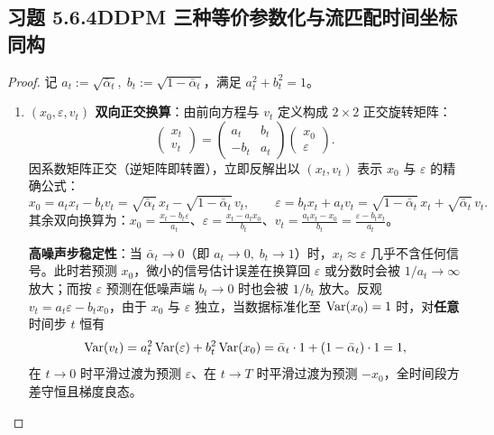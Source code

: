 \subsection*{习题 5.6.4\quad DDPM 三种等价参数化与流匹配时间坐标同构}
\begin{proof}
记 $a_t := \sqrt{\bar{\alpha}_t},\; b_t := \sqrt{1 - \bar{\alpha}_t}$，满足 $a_t^2 + b_t^2 = 1$。
\begin{enumerate}[label=(\alph*), leftmargin=1.8em]
  \item \textbf{$(x_0, \varepsilon, v_t)$ 双向正交换算}：由前向方程与 $v_t$ 定义构成 $2\times 2$ 正交旋转矩阵：
  \[
    \begin{pmatrix} x_t \\ v_t \end{pmatrix}
    = \begin{pmatrix} a_t & b_t \\ -b_t & a_t \end{pmatrix}
      \begin{pmatrix} x_0 \\ \varepsilon \end{pmatrix}.
  \]
  因系数矩阵正交（逆矩阵即转置），立即反解出以 $(x_t, v_t)$ 表示 $x_0$ 与 $\varepsilon$ 的精确公式：
  \[
    x_0 = a_t x_t - b_t v_t = \sqrt{\bar{\alpha}_t}\,x_t - \sqrt{1-\bar{\alpha}_t}\,v_t, \qquad
    \varepsilon = b_t x_t + a_t v_t = \sqrt{1-\bar{\alpha}_t}\,x_t + \sqrt{\bar{\alpha}_t}\,v_t.
  \]
  其余双向换算为：$x_0 = \frac{x_t - b_t \varepsilon}{a_t}$、$\varepsilon = \frac{x_t - a_t x_0}{b_t}$、$v_t = \frac{a_t x_t - x_0}{b_t} = \frac{\varepsilon - b_t x_t}{a_t}$。

  \textbf{高噪声步稳定性}：当 $\bar{\alpha}_t \to 0$（即 $a_t \to 0,\; b_t \to 1$）时，$x_t \approx \varepsilon$ 几乎不含任何信号。此时若预测 $x_0$，微小的信号估计误差在换算回 $\varepsilon$ 或分数时会被 $1/a_t \to \infty$ 放大；而按 $\varepsilon$ 预测在低噪声端 $b_t \to 0$ 时也会被 $1/b_t$ 放大。反观 $v_t = a_t \varepsilon - b_t x_0$，由于 $x_0$ 与 $\varepsilon$ 独立，当数据标准化至 $\operatorname{Var}(x_0) = 1$ 时，对\textbf{任意}时间步 $t$ 恒有
  \[
    \operatorname{Var}(v_t) = a_t^2 \operatorname{Var}(\varepsilon) + b_t^2 \operatorname{Var}(x_0) = \bar{\alpha}_t \cdot 1 + (1-\bar{\alpha}_t)\cdot 1 = 1,
  \]
  在 $t \to 0$ 时平滑过渡为预测 $\varepsilon$、在 $t \to T$ 时平滑过渡为预测 $-x_0$，全时间段方差守恒且梯度良态。


\end{enumerate}
\end{proof}
